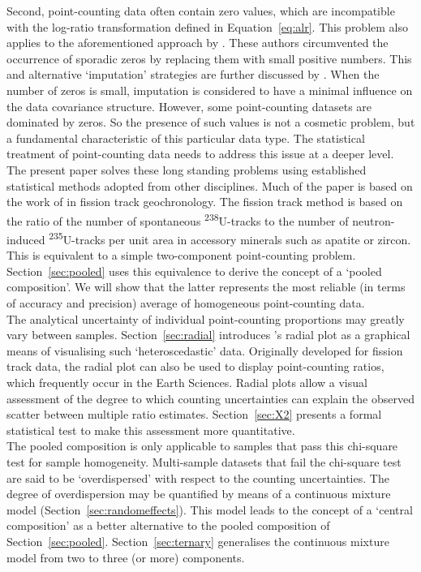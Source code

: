 \documentclass{article}
\begin{document}
Second, point-counting data often contain zero values, which are
incompatible with the log-ratio transformation defined in
Equation~\ref{eq:alr}. This problem also applies to the aforementioned
approach by \citet{bloemsma2015}. These authors circumvented the
occurrence of sporadic zeros by replacing them with small positive
numbers. This and alternative `imputation' strategies are further
discussed by \citet{martin2003}. When the number of zeros is small,
imputation is considered to have a minimal influence on the data
covariance structure.  However, some point-counting datasets are
dominated by zeros. So the presence of such values is not a cosmetic
problem, but a fundamental characteristic of this particular data
type. The statistical treatment of point-counting data needs to
address this issue at a deeper level.\\

The present paper solves these long standing problems using
established statistical methods adopted from other disciplines. Much
of the paper is based on the work of \citet{galbraith2005} in fission
track geochronology. The fission track method is based on the ratio of
the number of spontaneous \textsuperscript{238}U-tracks to the number
of neutron-induced \textsuperscript{235}U-tracks per unit area in
accessory minerals such as apatite or zircon. This is equivalent to a
simple two-component point-counting problem. Section~\ref{sec:pooled}
uses this equivalence to derive the concept of a `pooled
composition'. We will show that the latter represents the most
reliable (in terms of accuracy and precision) average of homogeneous
point-counting data.\\

The analytical uncertainty of individual point-counting proportions
may greatly vary between samples. Section~\ref{sec:radial} introduces
\citet{galbraith1988}'s radial plot as a graphical means of
visualising such `heteroscedastic' data. Originally developed for
fission track data, the radial plot can also be used to display
point-counting ratios, which frequently occur in the Earth
Sciences. Radial plots allow a visual assessment of the degree to
which counting uncertainties can explain the observed scatter between
multiple ratio estimates. Section~\ref{sec:X2} presents a formal
statistical test to make this assessment more quantitative.\\

The pooled composition is only applicable to samples that pass this
chi-square test for sample homogeneity.  Multi-sample datasets that
fail the chi-square test are said to be `overdispersed' with respect
to the counting uncertainties. The degree of overdispersion may be
quantified by means of a continuous mixture model
(Section~\ref{sec:randomeffects}). This model leads to the concept of
a `central composition' as a better alternative to the pooled
composition of Section~\ref{sec:pooled}.  Section~\ref{sec:ternary}
generalises the continuous mixture model from two to three (or more)
components.\\
\end{document}
